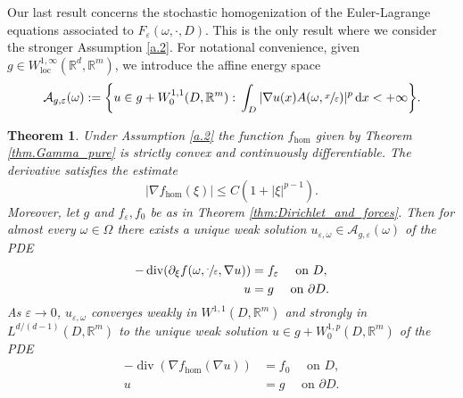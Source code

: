 \documentclass[JEP,XML,SOM,Unicode,published]{cedram}
\DeclareMathOperator{\dive}{div}
\newtheorem{theorem}{Theorem}[section]
\theoremstyle{definition}
\let\e\varepsilon
\let\w\omega
\newcommand{\dx}{\,\mathrm{d}x}
\newcommand{\R}{\mathbb{R}}
\begin{document}
Our last result concerns the stochastic homogenization of the Euler-Lagrange equations associated to $F_{\e}(\w,\cdot,D)$. This is the only result where we consider the stronger Assumption \ref{a.2}. For notational convenience, given $g\in W^{1,\infty}_\mathrm{loc}(\R^d,\R^m)$, we introduce the affine energy space
\begin{equation*}
\mathcal{A}_{g,\e}(\w):=\biggl\{u\in g+W^{1,1}_0(D,\R^m):\,\int_D|\nabla u(x)A(\w,\sfrac{x}{\e})|^p\dx<+\infty\biggr\}.
\end{equation*}
\begin{theorem}\label{thm.PDEs}
Under Assumption \ref{a.2} the function $f_{\hom}$ given by Theorem \ref{thm.Gamma_pure} is strictly convex and continuously differentiable. The derivative satisfies the estimate
\begin{equation*}
|\nabla f_{\hom}(\xi)|\leq C(1+|\xi|^{p-1}).
\end{equation*}
Moreover, let $g$ and $f_{\e},f_0$ be as in Theorem \ref{thm:Dirichlet_and_forces}. Then for almost every $\w\in\Omega$ there exists a unique weak solution $u_{\e,\w}\in \mathcal{A}_{g,\e}(\w)$ of the PDE
\begin{equation}\label{eq:epsPDE}
\begin{split}-\dive(\partial_{\xi }f(\w,\sfrac{\cdot}{\e},\nabla u))&=f_{\e}\quad\text{ on }D,
\\
u&=g\quad\text{ on }\partial D.
\end{split}
\end{equation}
As $\e\to 0$, $u_{\e,\w}$ converges weakly in $W^{1,1}(D,\R^m)$ and strongly in $L^{d/(d-1)}(D,\R^m)$ to the unique weak solution $u\in g+W^{1,p}_0(D,\R^m)$ of the PDE
\begin{align*}
-\dive(\nabla f_{\hom}(\nabla u))&=f_0\quad\text{ on }D,
\\
u&=g\quad\text{ on }\partial D.
\end{align*}
\end{theorem}
\skpt
\end{document}
